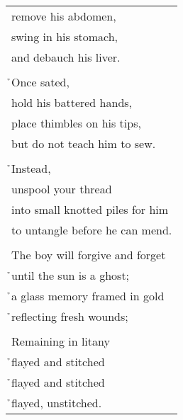 \documentclass{article}
\begin{document}
\begin{center}
\begin{longtable}{l}
remove his abdomen, \\
swing in his stomach, \\
and debauch his liver. \\
\\
\h{}Once sated, \\
hold his battered hands, \\
place thimbles on his tips, \\
but do not teach him to sew. \\
\\
\h{}Instead, \\
unspool your thread \\
into small knotted piles for him \\
to untangle before he can mend. \\
\\
The boy will forgive and forget \\
\h{}until the sun is a ghost; \\
\h{}a glass memory framed in gold \\
\h{}reflecting fresh wounds; \\
\\
Remaining in litany \\
\h{}flayed and stitched \\
\h{}flayed and stitched \\
\h{}flayed, unstitched. \\
\end{longtable}
\end{center}
\end{document}
